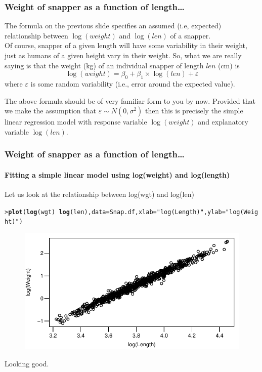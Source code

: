 \documentclass{beamer}\usepackage[]{graphicx}\usepackage[]{xcolor}
\makeatletter
\newcommand{\hlstr}[1]{\textcolor[rgb]{0.192,0.494,0.8}{#1}}%
\newcommand{\hlopt}[1]{\textcolor[rgb]{0,0,0}{#1}}%
\newcommand{\hlstd}[1]{\textcolor[rgb]{0.345,0.345,0.345}{#1}}%
\newcommand{\hlkwc}[1]{\textcolor[rgb]{0.333,0.667,0.333}{#1}}%
\newcommand{\hlkwd}[1]{\textcolor[rgb]{0.737,0.353,0.396}{\textbf{#1}}}%
\newenvironment{kframe}{%
 \def\at@end@of@kframe{}%
 \ifinner\ifhmode%
  \def\at@end@of@kframe{\end{minipage}}%
  \begin{minipage}{\columnwidth}%
 \fi\fi%
 \def\FrameCommand##1{\hskip\@totalleftmargin \hskip-\fboxsep
 \colorbox{shadecolor}{##1}\hskip-\fboxsep
     \hskip-\linewidth \hskip-\@totalleftmargin \hskip\columnwidth}%
 \MakeFramed {\advance\hsize-\width
   \@totalleftmargin\z@ \linewidth\hsize
   \@setminipage}}%
 {\par\unskip\endMakeFramed%
 \at@end@of@kframe}
\newenvironment{knitrout}{}{} %
\makeatother
\begin{document}
\begin{frame}[fragile]
\frametitle{Weight of snapper as a function of length\ldots}
The formula on the previous slide specifies an assumed (i.e, expected) relationship between
$\log(weight)$ and $\log(len)$ of a snapper.\\
\medskip
Of course, snapper of a given length will have some variability in their weight,
just as humans of a given height vary in their weight.
So, what we are really saying is that the weight (kg) of an individual snapper of length $len$ (cm)
is
\[
\log(weight) = \beta_0 +\beta_1 \times \log(len) + \varepsilon 
\]
where $\varepsilon$ is some random variability (i.e., error around the expected value).

\medskip

The above formula should be of very familiar form to you by now. 
Provided that we make the assumption that $\varepsilon \sim N(0,\sigma^2)$ then this is precisely
the simple linear regression model with response variable $\log(weight)$ and
explanatory variable $\log(len)$.
\end{frame}


\begin{frame}[fragile]
\frametitle{Weight of snapper as a function of length\ldots}
\framesubtitle{Fitting a simple linear model using log(weight) and log(length)}
Let us look at the relationship between log(wgt) and log(len)

\begin{knitrout}\scriptsize
{}\color{fgcolor}\begin{kframe}
\begin{alltt}
\hlstd{> }\hlkwd{plot}\hlstd{(}\hlkwd{log}\hlstd{(wgt)}\hlopt{~}\hlkwd{log}\hlstd{(len),}\hlkwc{data}\hlstd{=Snap.df,}\hlkwc{xlab}\hlstd{=}\hlstr{"log(Length)"}\hlstd{,}\hlkwc{ylab}\hlstd{=}\hlstr{"log(Weight)"}\hlstd{)}
\end{alltt}
\end{kframe}
\end{knitrout}



\begin{figure}
  \centering
  \includegraphics{figure/RC-H07-004}
\end{figure}

Looking good.
\end{frame}
\end{document}
